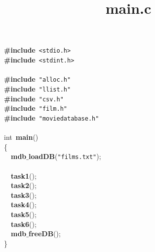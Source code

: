 \documentclass{article}
\title{main.c}
\date{}
\begin{document}
\maketitle

\noindent
\mbox{}\textbf{\#include}\ \texttt{\textless{}stdio.h\textgreater{}} \\
\mbox{}\textbf{\#include}\ \texttt{\textless{}stdint.h\textgreater{}} \\
\mbox{} \\
\mbox{}\textbf{\#include}\ \texttt{"{}alloc.h"{}} \\
\mbox{}\textbf{\#include}\ \texttt{"{}llist.h"{}} \\
\mbox{}\textbf{\#include}\ \texttt{"{}csv.h"{}} \\
\mbox{}\textbf{\#include}\ \texttt{"{}film.h"{}} \\
\mbox{}\textbf{\#include}\ \texttt{"{}moviedatabase.h"{}} \\
\mbox{} \\
\mbox{}int\ \textbf{main}() \\
\mbox{}\{ \\
\mbox{}\ \ \textbf{mdb$\_$loadDB}(\texttt{"{}films.txt"{}}); \\
\mbox{} \\
\mbox{}\ \ \textbf{task1}(); \\
\mbox{}\ \ \textbf{task2}(); \\
\mbox{}\ \ \textbf{task3}(); \\
\mbox{}\ \ \textbf{task4}(); \\
\mbox{}\ \ \textbf{task5}(); \\
\mbox{}\ \ \textbf{task6}(); \\
\mbox{}\ \ \textbf{mdb$\_$freeDB}(); \\
\mbox{}\} \\
\mbox{}
\end{document}

